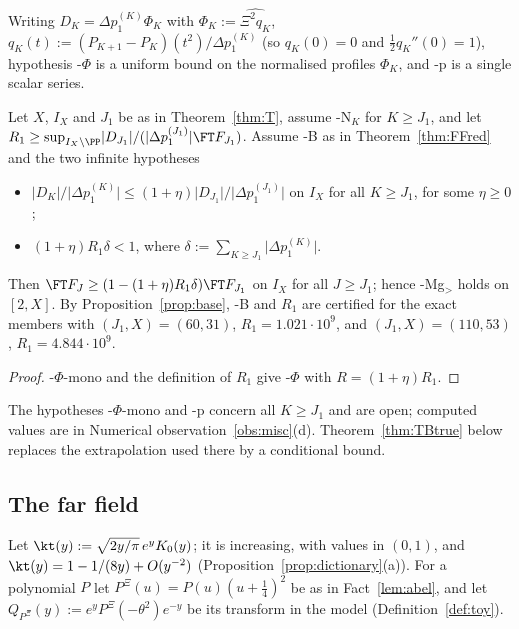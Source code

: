 Writing $D_K=\Delta p_1^{(K)}\Phi_K$ with $\Phi_K:=\widehat{\Xi^2q_K}$, $q_K(t):=(P_{K+1}-P_K)(t^2)/\Delta p_1^{(K)}$
(so $q_K(0)=0$ and $\frac12q_K''(0)=1$), hypothesis \hyp{$\Phi$} is a uniform bound on the normalised profiles $\Phi_K$, and
\hyp{p} is a single scalar series.

\begin{corollary}\label{cor:FFprime}
Let $X$, $I_X$ and $J_1$ be as in Theorem~\ref{thm:T}, assume \hyp{N}$_K$ for $K\ge J_1$, and let
$R_1\ge\sup_{I_X\setminus\PP}\lvert D_{J_1}\rvert/(\lvert\Delta p_1^{(J_1)}\rvert\FT F_{J_1})$. Assume \hyp{B} as in
Theorem~\ref{thm:FFred} and the two infinite hypotheses
\begin{itemize}[leftmargin=4.5em]
\item[\hyp{$\Phi$-mono}] $\lvert D_K\rvert/\lvert\Delta p_1^{(K)}\rvert\le(1+\eta)\lvert D_{J_1}\rvert/\lvert\Delta p_1^{(J_1)}\rvert$ on $I_X$ for all $K\ge J_1$,
for some $\eta\ge0$;
\item[\hyp{p}] $(1+\eta)R_1\delta<1$, where $\delta:=\sum_{K\ge J_1}\lvert\Delta p_1^{(K)}\rvert$.
\end{itemize}
Then $\FT F_J\ge(1-(1+\eta)R_1\delta)\FT F_{J_1}$ on $I_X$ for all $J\ge J_1$; hence \hyp{Mg$_>$} holds on $[2,X]$. By
Proposition~\ref{prop:base}, \hyp{B} and $R_1$ are certified for the exact members with $(J_1,X)=(60,31)$,
$R_1=1.021\cdot10^9$, and $(J_1,X)=(110,53)$, $R_1=4.844\cdot10^9$.
\end{corollary}

\begin{proof}
\hyp{$\Phi$-mono} and the definition of $R_1$ give \hyp{$\Phi$} with $R=(1+\eta)R_1$.
\end{proof}

The hypotheses \hyp{$\Phi$-mono} and \hyp{p} concern all $K\ge J_1$ and are open; computed values are in Numerical
observation~\ref{obs:misc}(d). Theorem~\ref{thm:TBtrue} below replaces the extrapolation used there by a conditional
bound.

\subsection{The far field}\label{ssec:farfield}

Let $\kt(y):=\sqrt{2y/\pi}\,e^{y}K_0(y)$; it is increasing, with values in $(0,1)$, and
$\kt(y)=1-1/(8y)+O(y^{-2})$ (Proposition~\ref{prop:dictionary}(a)). For a polynomial $P$ let $P^{\Xi}(u)=P(u)(u+\frac14)^2$ be
as in Fact~\ref{lem:abel}, and let $Q_{P^\Xi}(y):=e^{y}P^{\Xi}(-\theta^2)e^{-y}$ be its transform in the model
(Definition~\ref{def:toy}).

